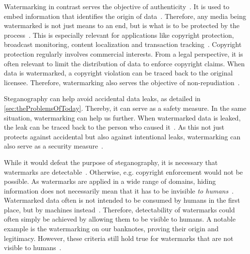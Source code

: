 Watermarking in contrast serves the objective of authenticity~\cite{evsutinDigitalSteganographyWatermarking2020,megiasDataHidingIts2021}. It is used to embed information that identifies the origin of data~\cite{evsutinDigitalSteganographyWatermarking2020}. Therefore, any media being watermarked is not just means to an end, but is what is to be protected by the process~\cite{evsutinDigitalSteganographyWatermarking2020}. This is especially relevant for applications like copyright protection, broadcast monitoring, content localization and transaction tracking~\cite{malikHighCapacityText2017,megiasDataHidingIts2021}. Copyright protection regularly involves commercial interests. From a legal perspective, it is often relevant to limit the distribution of data to enforce copyright claims. When data is watermarked, a copyright violation can be traced back to the original licensee. Therefore, watermarking also serves the objective of non-repudiation~\cite{megiasDataHidingIts2021}.

Steganography can help avoid accidental data leaks, as detailed in \cref{sec:theProblemsOfToday}. Thereby, it can serve as a safety measure. In the same situation, watermarking can help us further. When watermarked data is leaked, the leak can be traced back to the person who caused it~\cite{evsutinDigitalSteganographyWatermarking2020}. As this not just protects against accidental but also against intentional leaks, watermarking can also serve as a security measure~\cite{evsutinDigitalSteganographyWatermarking2020}.

While it would defeat the purpose of steganography, it is necessary that watermarks are detectable~\cite{evsutinDigitalSteganographyWatermarking2020,soltanipanahPropertiesNonMediaDigital2016}. Otherwise, e.g. copyright enforcement would not be possible. As watermarks are applied in a wide range of domains, hiding information does not necessarily mean that it has to be invisible \textit{to humans}~\cite{soltanipanahPropertiesNonMediaDigital2016}. Watermarked data often is not intended to be consumed by humans in the first place, but by machines instead~\cite{soltanipanahPropertiesNonMediaDigital2016}. Therefore, detectability of watermarks could often simply be achieved by allowing them to be visible to humans. A notable example is the watermarking on our banknotes, proving their origin and legitimacy. However, these criteria still hold true for watermarks that are not visible to humans~\cite{evsutinDigitalSteganographyWatermarking2020,soltanipanahPropertiesNonMediaDigital2016}.

